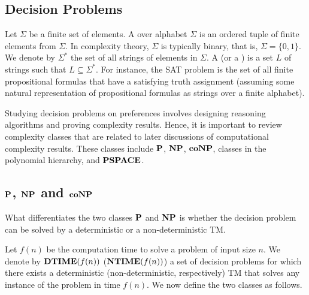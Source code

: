 \subsection{Decision Problems}
Let $\Sigma$ be a finite set of elements. A  over alphabet $\Sigma$
is an ordered tuple of finite elements from $\Sigma$. In complexity theory,
$\Sigma$ is typically binary, that is, $\Sigma=\{0,1\}$.
We denote by $\Sigma^*$ the set of all strings of elements in $\Sigma$.
A  (or a ) is a set 
$L$ of strings such that $L \subseteq \Sigma^*$.
For instance, the SAT problem is the set of all finite propositional
formulas that have a satisfying truth assignment (assuming some natural
representation of propositional formulas as strings over a finite alphabet).


Studying decision problems on preferences involves designing 
reasoning algorithms and proving complexity results.  
Hence, it is important to review complexity classes
that are related to later discussions of computational complexity results.
These classes include $\textbf{P}$, $\textbf{NP}$, $\textbf{coNP}$, classes in the polynomial
hierarchy, and $\textbf{PSPACE}$.


\subsection{$\textbf{P}$, $\textbf{NP}$ and $\textbf{coNP}$}
What differentiates the two classes $\textbf{P}$ and $\textbf{NP}$ is whether the decision problem
can be solved by a deterministic or a non-deterministic TM. \cite{Arora:Comput}

Let $f(n)$ be the computation time to solve a problem of input size $n$.
We denote by $\textbf{DTIME}(f(n))$ ($\textbf{NTIME}(f(n))$) a set of decision problems 
for which there exists a deterministic (non-deterministic, respectively) TM
that solves any instance of the problem in time $f(n)$.
We now define the two classes as follows.

